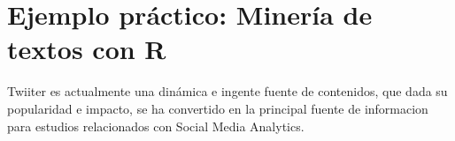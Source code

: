 \chapter{Ejemplo práctico: Minería de textos con R}
\label{cha:Mineria-textos-r}

Twiiter es actualmente una dinámica e ingente fuente de contenidos, que dada su popularidad e impacto, se ha convertido en la principal fuente de informacion para estudios relacionados con Social Media Analytics.
